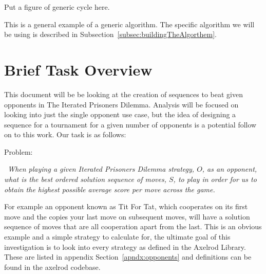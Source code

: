 Put a figure of generic cycle here.\label{fig:genericGeneticAlgoCycle} 

This is a general example of a generic algorithm.
The specific algorithm we will be using is described in Subsection~\ref{subsec:buildingTheAlgorthem}.

\section{Brief Task Overview}\label{sec:briefOverview}
This document will be be looking at the creation of sequences to beat given opponents in The Iterated Prisoners Dilemma.
Analysis will be focused on looking into just the single opponent use case, but the idea of designing a sequence for a tournament for a given number of opponents is a potential follow on to this work.
Our task is as follows:

Problem:
\begin{center}
    \itshape~When playing a given Iterated Prisoners Dilemma strategy, \(O\), as an opponent, what is the best ordered solution sequence of moves, \(S\), to play in order for us to obtain the highest possible average score per move across the game.
\end{center}

For example an opponent known as Tit For Tat, which cooperates on its first move and the copies your last move on subsequent moves, will have a solution sequence of moves that are all cooperation apart from the last.
This is an obvious example and a simple strategy to calculate for, the ultimate goal of this investigation is to look into every strategy as defined in the Axelrod Library.
These are listed in appendix Section~\ref{apndx:opponents} and definitions can be found in the axelrod codebase\cite{axelrodproject}.
